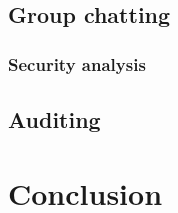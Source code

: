 \documentclass[11pt,en]{elegantpaper}
\begin{document}


\subsection{Group chatting}

\subsubsection{Security analysis}


\subsection{Auditing}



\section{Conclusion}




\end{document}
